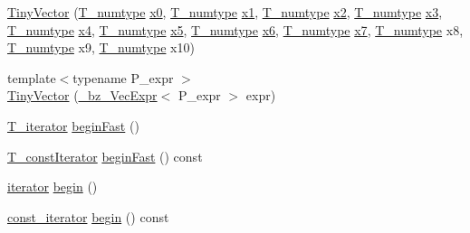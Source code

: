 \begin{DoxyCompactItemize}
\item 
\hyperlink{classTinyVector_a3bd02ef633d40144fea0170ae888bebf}{Tiny\+Vector} (\hyperlink{classTinyVector_ab8e7df758dd5a369e92b3cb54a48bdbe}{T\+\_\+numtype} \hyperlink{gendata_8m_aa48da42c617fdb7cf84e9a3f80aa04e8}{x0}, \hyperlink{classTinyVector_ab8e7df758dd5a369e92b3cb54a48bdbe}{T\+\_\+numtype} \hyperlink{gendata_8m_ac39b33361203e68d7820336db48d45e6}{x1}, \hyperlink{classTinyVector_ab8e7df758dd5a369e92b3cb54a48bdbe}{T\+\_\+numtype} \hyperlink{gendata_8m_aab2463cd078f7c5368f6eb80f5a549b8}{x2}, \hyperlink{classTinyVector_ab8e7df758dd5a369e92b3cb54a48bdbe}{T\+\_\+numtype} \hyperlink{gendata_8m_a03ad2628eb1c540113251638112541e3}{x3}, \hyperlink{classTinyVector_ab8e7df758dd5a369e92b3cb54a48bdbe}{T\+\_\+numtype} \hyperlink{gendata_8m_a6bda50c9c4fcd62d903ac36326be97fa}{x4}, \hyperlink{classTinyVector_ab8e7df758dd5a369e92b3cb54a48bdbe}{T\+\_\+numtype} \hyperlink{gendata_8m_ada1c75f0b02ca3e175d740e56846ebe2}{x5}, \hyperlink{classTinyVector_ab8e7df758dd5a369e92b3cb54a48bdbe}{T\+\_\+numtype} \hyperlink{gendata_8m_ad6d3d5dc708b3e9ca4465d0d189b0514}{x6}, \hyperlink{classTinyVector_ab8e7df758dd5a369e92b3cb54a48bdbe}{T\+\_\+numtype} \hyperlink{gendata_8m_a0d4a0f2f58d6d7ae22259e658c4bbe5d}{x7}, \hyperlink{classTinyVector_ab8e7df758dd5a369e92b3cb54a48bdbe}{T\+\_\+numtype} x8, \hyperlink{classTinyVector_ab8e7df758dd5a369e92b3cb54a48bdbe}{T\+\_\+numtype} x9, \hyperlink{classTinyVector_ab8e7df758dd5a369e92b3cb54a48bdbe}{T\+\_\+numtype} x10)
\item 
{\footnotesize template$<$typename P\+\_\+expr $>$ }\\\hyperlink{classTinyVector_a51231275807f0841281bbebaa2706a4b}{Tiny\+Vector} (\hyperlink{class__bz__VecExpr}{\+\_\+bz\+\_\+\+Vec\+Expr}$<$ P\+\_\+expr $>$ expr)
\item 
\hyperlink{classTinyVector_a6044134b6f2401fe4e2d73bd7dfa25c7}{T\+\_\+iterator} \hyperlink{classTinyVector_ab0f3a27787c2cca5572248c2102459c4}{begin\+Fast} ()
\item 
\hyperlink{classTinyVector_af420f8f49beb7efac60ac22a5d1f2e84}{T\+\_\+const\+Iterator} \hyperlink{classTinyVector_ac0fc61c75970f50e4721a06b0e660bdb}{begin\+Fast} () const 
\item 
\hyperlink{classTinyVector_a7e1e065c0b894add536ab278dfe28202}{iterator} \hyperlink{classTinyVector_a515d02738c299b0006140995286916f6}{begin} ()
\item 
\hyperlink{classTinyVector_a58fc9319708794276cdad6399cf03eed}{const\+\_\+iterator} \hyperlink{classTinyVector_ac34147e11e5db228d3f64b98017c6ada}{begin} () const 

\end{DoxyCompactItemize}
